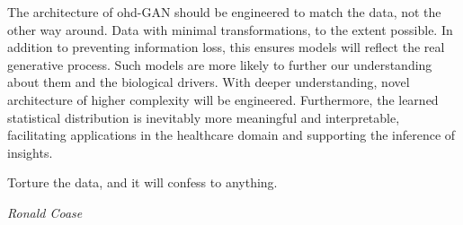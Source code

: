 \footnotesize
{}
\begin{tcolorbox}[
    arc=0mm, 
    colback=cadmiumgreen!10!white, 
    coltext=cadmiumgreen!90!black,  
    colframe=cadmiumgreen!90!black,
    colbacktitle=cadmiumgreen!80,
    leftrule=3mm,
    rightrule=0mm, 
    toprule=0mm, 
    bottomrule=0mm, 
    box align=top]
    
The architecture of \gls{ohd}-GAN should be engineered to match the data, not the other way around. Data with minimal transformations, to the extent possible. In addition to preventing information loss, this ensures models will reflect the real generative process. Such models are more likely to further our understanding about them and the biological drivers. With deeper understanding, novel architecture of higher complexity will be engineered. Furthermore, the learned statistical distribution is inevitably more meaningful and interpretable, facilitating applications in the healthcare domain and supporting the inference of insights. 

\end{tcolorbox}
\hfill
\begin{tcolorbox}[tcbox width=auto, 
    arc=0mm, 
    colback=white, 
    coltext=cadmiumgreen, 
    boxrule=0pt, 
    colframe=white,
    box align=top]

\epigraph{Torture the data, and it will confess to anything.}{\textit{Ronald Coase}}

\end{tcolorbox}
\normalsize